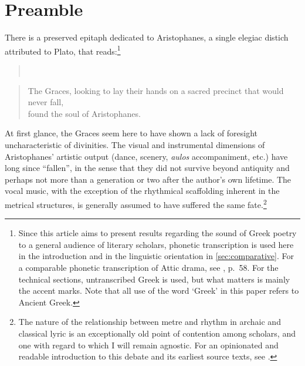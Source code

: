 \documentclass[twoside]{article}
\begin{document}
\section{Preamble}
There is a preserved epitaph dedicated to Aristophanes, a single elegiac distich attributed to Plato, that reads:\footnote{Since this article aims to present results regarding the sound of Greek poetry to a general audience of literary scholars, phonetic transcription is used here in the introduction and in the linguistic orientation in \autoref{sec:comparative}. For a comparable phonetic transcription of Attic drama, see \textcite{horrocksGreekHistoryLanguage2010}, p.\ 58. For the technical sections, untranscribed Greek is used, but what matters is mainly the accent marks. Note that all use of the word `Greek' in this paper refers to Ancient Greek.}

\begin{verse}
    \\
\end{verse}
\begin{verse}
    The Graces, looking to lay their hands on a sacred precinct that would never fall,\\
    found the soul of Aristophanes.
\end{verse}

At first glance, the Graces seem here to have shown a lack of foresight uncharacteristic of divinities. The visual and instrumental dimensions of Aristophanes' artistic output (dance, scenery, \textit{aulos} accompaniment, etc.) have long since ``fallen'', in the sense that they did not survive beyond antiquity and perhaps not more than a generation or two after the author's own lifetime. The vocal music, with the exception of the rhythmical scaffolding inherent in the metrical structures, is generally assumed to have suffered the same fate.\footnote{The nature of the relationship between metre and rhythm in archaic and classical lyric is an exceptionally old point of contention among scholars, and one with regard to which I will remain agnostic. For an opinionated and readable introduction to this debate and its earliest source texts, see \textcite{pearsonElementaRhythmicaFragment1990}.} 
\end{document}

